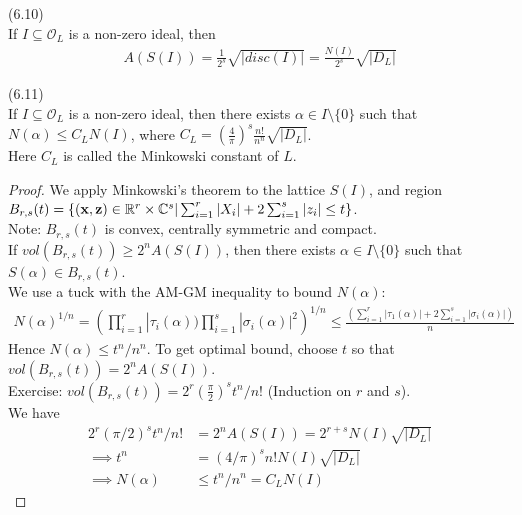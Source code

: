 \documentclass[a4paper]{article}
\begin{document}
\begin{lemma} (6.10)\\
If $I \subseteq \mathcal{O}_L$ is a non-zero ideal, then
\begin{equation*}
\begin{aligned}
A(S(I)) = \frac{1}{2^s} \sqrt{|disc(I)|} = \frac{N(I)}{2^s} \sqrt{|D_L|}
\end{aligned}
\end{equation*}
\end{lemma}

\begin{prop} (6.11)\\
If $I\subseteq \mathcal{O}_L$ is a non-zero ideal, then there exists $\alpha \in I \setminus \{0\}$ such that $N(\alpha) \leq C_L N(I)$, where $C_L = (\frac{4}{\pi})^s \frac{n!}{n^n} \sqrt{|D_L|}$.\\
Here $C_L$ is called the Minkowski constant of $L$.
\begin{proof}
We apply Minkowski's theorem to the lattice $S(I)$, and region $B_{r,s}(t) = \{(\mathbf{x},\mathbf{z}) \in \mathbb{R}^r \times \mathbb{C}^s | \sum_{i=1}^r |X_i| + 2\sum_{i=1}^s |z_i| \leq t\}$.\\
Note: $B_{r,s} (t)$ is convex, centrally symmetric and compact.\\
If $vol(B_{r,s}(t)) \geq 2^n A(S(I))$, then there exists $\alpha \in I \setminus \{0\}$ such that $S(\alpha) \in B_{r,s}(t)$.\\
We use a tuck with the AM-GM inequality to bound $N(\alpha)$:
\begin{equation*}
\begin{aligned}
N(\alpha)^{1/n} = (\prod_{i=1}^r |\tau_i(\alpha)) \prod_{i=1}^s |\sigma_i(\alpha)|^2)^{1/n} \leq \frac{(\sum_{i=1}^r |\tau_1(\alpha)| + 2\sum_{i=1}^s |\sigma_i(\alpha)|)}{n}
\end{aligned}
\end{equation*}
Hence $N(\alpha) \leq t^n/n^n$. To get optimal bound, choose $t$ so that $vol(B_{r,s}(t)) = 2^n A(S(I))$.\\
Exercise: $vol(B_{r,s}(t)) = 2^r (\frac{\pi}{2})^s t^n/n!$ (Induction on $r$ and $s$).\\
We have
\begin{equation*}
\begin{aligned}
2^r (\pi/2)^s t^n / n! &= 2^n A(S(I)) = 2^{r+s} N(I) \sqrt{|D_L|}\\
\implies t^n &= (4/\pi)^s n! N(I) \sqrt{|D_L|}\\
\implies N(\alpha) &\leq t^n/n^n = C_L N(I)
\end{aligned}
\end{equation*}
\end{proof}
\end{prop}
\end{document}
